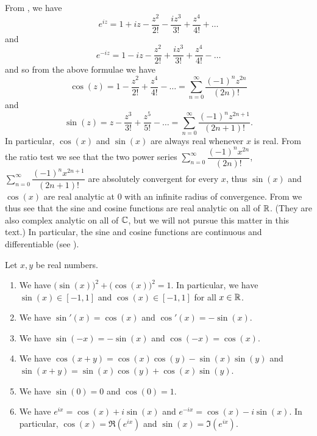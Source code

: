 \begin{ac}\label{ii:ac:4.7.1}
  From , we have
  \[
    e^{i z} = 1 + i z - \dfrac{z^2}{2!} - \dfrac{i z^3}{3!} + \dfrac{z^4}{4!} + \dots
  \]
  and
  \[
    e^{- i z} = 1 - i z - \dfrac{z^2}{2!} + \dfrac{i z^3}{3!} + \dfrac{z^4}{4!} - \dots
  \]
  and so from the above formulae we have
  \[
    \cos(z) = 1 - \dfrac{z^2}{2!} + \dfrac{z^4}{4!} - \dots = \sum_{n = 0}^\infty \dfrac{(-1)^n z^{2n}}{(2n)!}
  \]
  and
  \[
    \sin(z) = z - \dfrac{z^3}{3!} + \dfrac{z^5}{5!} - \dots = \sum_{n = 0}^\infty \dfrac{(-1)^n z^{2n + 1}}{(2n + 1)!}.
  \]
  In particular, \(\cos(x)\) and \(\sin(x)\) are always real whenever \(x\) is real.
  From the ratio test we see that the two power series \(\sum_{n = 0}^\infty \dfrac{(-1)^n x^{2n}}{(2n)!}\), \(\sum_{n = 0}^\infty \dfrac{(-1)^n x^{2n + 1}}{(2n + 1)!}\) are absolutely convergent for every \(x\), thus \(\sin(x)\) and \(\cos(x)\) are real analytic at \(0\) with an infinite radius of convergence.
  From  we thus see that the sine and cosine functions are real analytic on all of \(\mathbb{R}\).
  (They are also complex analytic on all of \(\mathbb{C}\), but we will not pursue this matter in this text.)
  In particular, the sine and cosine functions are continuous and differentiable (see ).
\end{ac}

\begin{thm}\label{ii:4.7.2}
  Let \(x, y\) be real numbers.
  \begin{enumerate}
    \item\label{ii:4.7.2.a} We have \(\big(\sin(x)\big)^2 + \big(\cos(x)\big)^2 = 1\).
    In particular, we have \(\sin(x) \in [-1, 1]\) and \(\cos(x) \in [-1, 1]\) for all \(x \in \mathbb{R}\).
    \item\label{ii:4.7.2.b} We have \(\sin'(x) = \cos(x)\) and \(\cos'(x) = -\sin(x)\).
    \item\label{ii:4.7.2.c} We have \(\sin(-x) = -\sin(x)\) and \(\cos(-x) = \cos(x)\).
    \item\label{ii:4.7.2.d} We have \(\cos(x + y) = \cos(x) \cos(y) - \sin(x) \sin(y)\) and \(\sin(x + y) = \sin(x) \cos(y) + \cos(x) \sin(y)\).
    \item\label{ii:4.7.2.e} We have \(\sin(0) = 0\) and \(\cos(0) = 1\).
    \item\label{ii:4.7.2.f} We have \(e^{i x} = \cos(x) + i \sin(x)\) and \(e^{- i x} = \cos(x) - i \sin(x)\).
    In particular, \(\cos(x) = \Re(e^{i x})\) and \(\sin(x) = \Im(e^{i x})\).
  \end{enumerate}
\end{thm}

